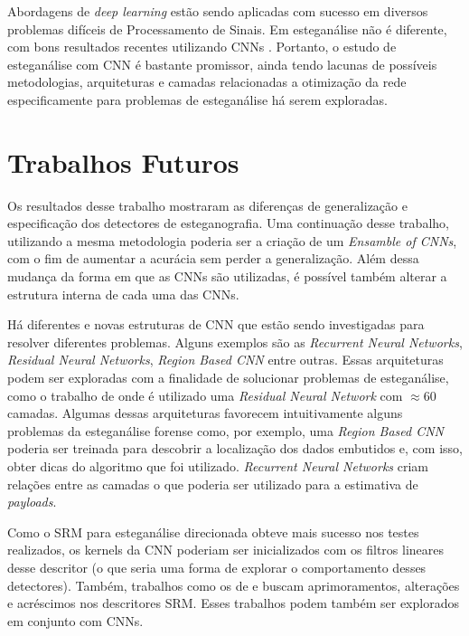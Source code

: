 Abordagens de \textit{deep learning} estão sendo aplicadas com sucesso em diversos problemas difíceis de Processamento de Sinais. Em esteganálise não é diferente, com bons resultados recentes utilizando CNNs \cite{tan2014stacked,qian2015deep,cnn_base,xu2016ensemble}. Portanto, o estudo de esteganálise com CNN é bastante promissor, ainda tendo lacunas de possíveis metodologias, arquiteturas e camadas relacionadas a otimização da rede especificamente para problemas de esteganálise há serem exploradas.

\section{Trabalhos Futuros}
\label{sec:trabalhosFuturos}

Os resultados desse trabalho mostraram as diferenças de generalização e especificação dos detectores de esteganografia. Uma continuação desse trabalho, utilizando a mesma metodologia poderia ser a criação de um \textit{Ensamble of CNNs}, com o fim de aumentar a acurácia sem perder a generalização. Além dessa mudança da forma em que as CNNs são utilizadas, é possível também alterar a estrutura interna de cada uma das CNNs.

Há diferentes e novas estruturas de CNN que estão sendo investigadas para resolver diferentes problemas. Alguns exemplos são as \textit{Recurrent Neural Networks}, \textit{Residual Neural Networks}, \textit{Region Based CNN} entre outras. Essas arquiteturas podem ser exploradas com a finalidade de solucionar problemas de esteganálise, como o trabalho de  onde é utilizado uma \textit{Residual Neural Network} com $\approx 60$ camadas. Algumas dessas arquiteturas favorecem intuitivamente alguns problemas da esteganálise forense como, por exemplo, uma \textit{Region Based CNN} poderia ser treinada para descobrir a localização dos dados embutidos e, com isso, obter dicas do algoritmo que foi utilizado. \textit{Recurrent Neural Networks} criam relações entre as camadas o que poderia ser utilizado para a estimativa de \textit{payloads}.

Como o SRM para esteganálise direcionada obteve mais sucesso nos testes realizados, os kernels da CNN poderiam ser inicializados com os filtros lineares desse descritor (o que seria uma forma de explorar o comportamento desses detectores). Também, trabalhos como os de  e  buscam aprimoramentos, alterações e acréscimos nos descritores SRM. Esses trabalhos podem também ser explorados em conjunto com CNNs.

